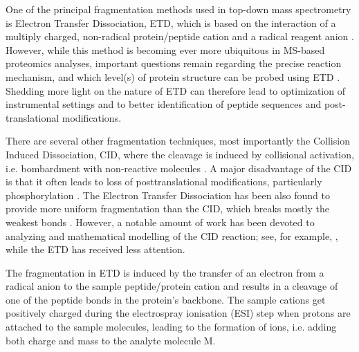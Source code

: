 \documentclass{llncs}
\begin{document}
One of the principal fragmentation methods used in top-down mass spectrometry is Electron Transfer Dissociation, ETD, which is based on the interaction of a multiply charged, non-radical protein/peptide cation and a radical reagent anion \cite{Syka2004-rg,Zhurov2013-ua}. However, while this method is becoming ever more ubiquitous in MS-based proteomics analyses, important questions remain regarding the precise reaction mechanism, and which level(s) of protein structure can be probed using ETD \cite{Sohn2009-zv,Sohn2015-rp}. Shedding more light on the nature of ETD can therefore lead to optimization of instrumental settings and to better identification of peptide sequences and post-translational modifications.

There are several other fragmentation techniques, most importantly the Collision Induced Dissociation, CID, where the cleavage is induced by collisional activation, i.e. bombardment with non-reactive molecules \cite{Mitchell_Wells2005-gn}. A major disadvantage of the CID is that it often leads to loss of posttranslational modifications, particularly phosphorylation \cite{Kim2012-yz}. The Electron Transfer Dissociation has been also found to provide more uniform fragmentation than the CID, which breaks mostly the weakest bonds \cite{Kim2012-yz,Zhurov2013-ua}. However, a notable amount of work has been devoted to analyzing and mathematical modelling of the CID reaction; see, for example, \cite{Zhang2004-fp,Zhang2005-jn,Wysocki2000-am}, while the ETD has received less attention.

The fragmentation in ETD is induced by the transfer of an electron from a radical anion to the sample peptide/protein cation and results in a cleavage of one of the peptide bonds  in the protein’s backbone. The sample cations get positively charged during the electrospray ionisation (ESI) step \cite{Fenn1989-mp} when protons are attached to the sample molecules, leading to the formation of  ions, i.e. adding both charge and mass to the analyte molecule M.
\end{document}
